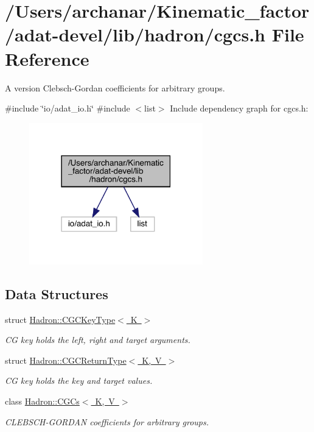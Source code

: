 \hypertarget{adat-devel_2lib_2hadron_2cgcs_8h}{}\section{/\+Users/archanar/\+Kinematic\+\_\+factor/adat-\/devel/lib/hadron/cgcs.h File Reference}
\label{adat-devel_2lib_2hadron_2cgcs_8h}


A version Clebsch-\/\+Gordan coefficients for arbitrary groups.  


{\ttfamily \#include \char`\"{}io/adat\+\_\+io.\+h\char`\"{}}\newline
{\ttfamily \#include $<$list$>$}\newline
Include dependency graph for cgcs.\+h\+:
\nopagebreak
\begin{figure}[H]
\begin{center}
\leavevmode
\includegraphics[width=214pt]{d3/ddb/adat-devel_2lib_2hadron_2cgcs_8h__incl}
\end{center}
\end{figure}
\subsection*{Data Structures}
\begin{DoxyCompactItemize}
\item 
struct \mbox{\hyperlink{structHadron_1_1CGCKeyType}{Hadron\+::\+C\+G\+C\+Key\+Type$<$ K $>$}}
\begin{DoxyCompactList}\small\item\em CG key holds the left, right and target arguments. \end{DoxyCompactList}\item 
struct \mbox{\hyperlink{structHadron_1_1CGCReturnType}{Hadron\+::\+C\+G\+C\+Return\+Type$<$ K, V $>$}}
\begin{DoxyCompactList}\small\item\em CG key holds the key and target values. \end{DoxyCompactList}\item 
class \mbox{\hyperlink{classHadron_1_1CGCs}{Hadron\+::\+C\+G\+Cs$<$ K, V $>$}}
\begin{DoxyCompactList}\small\item\em C\+L\+E\+B\+S\+C\+H-\/\+G\+O\+R\+D\+AN coefficients for arbitrary groups. \end{DoxyCompactList}\end{DoxyCompactItemize}

